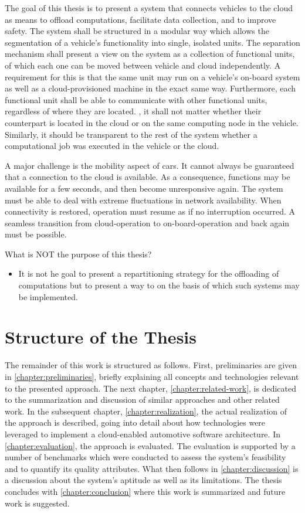 The goal of this thesis is to present a system that connects vehicles to the cloud as means to offload computations, facilitate data collection, and to improve safety. The system shall be structured in a modular way which allows the segmentation of a vehicle's functionality into single, isolated units. The separation mechanism shall present a view on the system as a collection of functional units, of which each one can be moved between vehicle and cloud independently. A requirement for this is that the same unit may run on a vehicle's on-board system as well as a cloud-provisioned machine in the exact same way. Furthermore,  each functional unit shall be able to communicate with other functional units, regardless of where they are located. \Ie , it shall not matter whether their counterpart is located in the cloud or on the same computing node in the vehicle. Similarly, it should be transparent to the rest of the system whether a computational job was executed in the vehicle or the cloud. 

A major challenge is the mobility aspect of cars. It cannot always be guaranteed that a connection to the cloud is available. As a consequence, functions may be available for a few seconds, and then become unresponsive again. The system must be able to deal with extreme fluctuations in network availability. When connectivity is restored, operation must resume as if no interruption occurred. A seamless transition from cloud-operation to on-board-operation and back again must be possible.

What is NOT the purpose of this thesis?
\begin{itemize}
\item It is not he goal to present a repartitioning strategy for the offloading of computations but to present a way to on the basis of which such systems may be implemented.
\end{itemize}


%
%
%
%
%
%
%
%
%
%

\section{Structure of the Thesis}

The remainder of this work is structured as follows. First, preliminaries are given in \autoref{chapter:preliminaries}, briefly explaining all concepts and technologies relevant to the presented approach. The next chapter, \autoref{chapter:related-work}, is dedicated to the summarization and discussion of similar approaches and other related work. In the subsequent chapter, \autoref{chapter:realization}, the actual realization of the approach is described, going into detail about how technologies were leveraged to implement a cloud-enabled automotive software architecture. In \autoref{chapter:evaluation}, the approach is evaluated. The evaluation is supported by a number of benchmarks which were conducted to assess the system's feasibility and to quantify its quality attributes. What then follows in \autoref{chapter:discussion} is a discussion about the system's aptitude as well as its limitations. The thesis concludes with \autoref{chapter:conclusion} where this work is summarized and future work is suggested.

%
%
%
%
%
%
%
%
%
%
%
%
%
%
%
%
%
%
%
%
%
%
%
%
%
%
%
%
%
%
%
%
%
%
%
%
%
%
